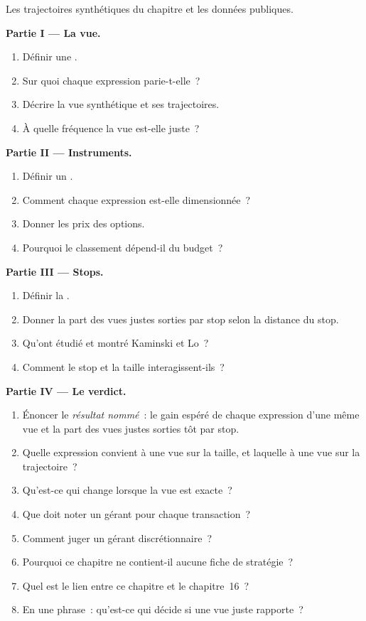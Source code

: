 \begin{problem}\label{pb:s2:discretionary-macro:1}
Les trajectoires synthétiques du chapitre et les données publiques.

\medskip\noindent\textbf{Partie I --- La vue.}
\begin{enumerate}
\item Définir une .
\item Sur quoi chaque expression parie-t-elle~?
\item Décrire la vue synthétique et ses trajectoires.
\item À quelle fréquence la vue est-elle juste~?
\end{enumerate}

\medskip\noindent\textbf{Partie II --- Instruments.}
\begin{enumerate}[resume]
\item Définir un .
\item Comment chaque expression est-elle dimensionnée~?
\item Donner les prix des options.
\item Pourquoi le classement dépend-il du budget~?
\end{enumerate}

\medskip\noindent\textbf{Partie III --- Stops.}
\begin{enumerate}[resume]
\item Définir la .
\item Donner la part des vues justes sorties par stop selon la distance du stop.
\item Qu'ont étudié et montré Kaminski et Lo~?
\item Comment le stop et la taille interagissent-ils~?
\end{enumerate}

\medskip\noindent\textbf{Partie IV --- Le verdict.}
\begin{enumerate}[resume]
\item Énoncer le \emph{résultat nommé}~: le gain espéré de chaque expression d'une même vue et la part des vues justes sorties tôt par stop.
\item Quelle expression convient à une vue sur la taille, et laquelle à une vue sur la trajectoire~?
\item Qu'est-ce qui change lorsque la vue est exacte~?
\item Que doit noter un gérant pour chaque transaction~?
\item Comment juger un gérant discrétionnaire~?
\item Pourquoi ce chapitre ne contient-il aucune fiche de stratégie~?
\item Quel est le lien entre ce chapitre et le chapitre~16~?
\item En une phrase~: qu'est-ce qui décide si une vue juste rapporte~?
\end{enumerate}
\end{problem}

